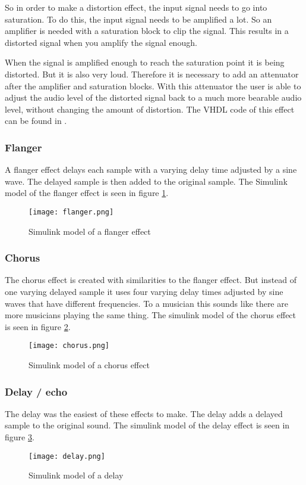 So in order to make a distortion effect, the input signal needs to go into saturation. To do this, the input signal needs to be amplified a lot. So an amplifier is needed with a saturation block to clip the signal. This results in a distorted signal when you amplify the signal enough.

When the signal is amplified enough to reach the saturation point it is being distorted. But it is also very loud. Therefore it is necessary to add an attenuator after the amplifier and saturation blocks. With this attenuator the user is able to adjust the audio level of the distorted signal back to a much more bearable audio level, without changing the amount of distortion. The VHDL code of this effect can be found in \nameref{}.

\subsubsection{Flanger}
A flanger effect delays each sample with a varying delay time adjusted by a sine wave. The delayed sample is then added to the original sample. The Simulink model of the flanger effect is seen in figure \ref{fig:flangersimulink}.

\begin{figure}[ht]
    \centering
    \texttt{[image: flanger.png]}
    \caption{Simulink model of a flanger effect}
    \label{fig:flangersimulink}
\end{figure}

\subsubsection{Chorus}
The chorus effect is created with similarities to the flanger effect. But instead of one varying delayed sample it uses four varying delay times adjusted by sine waves that have different frequencies. To a musician this sounds like there are more musicians playing the same thing. The simulink model of the chorus effect is seen in figure \ref{fig:chorussimulink}.

\begin{figure}[ht]
    \texttt{[image: chorus.png]}
    \caption{Simulink model of a chorus effect}
    \label{fig:chorussimulink}
\end{figure}

\subsubsection{Delay / echo}
The delay was the easiest of these effects to make. The delay adds a delayed sample to the original sound. The simulink model of the delay effect is seen in figure \ref{fig:delaysimulink}.

\begin{figure}[ht]
    \centering
    \texttt{[image: delay.png]}
    \caption{Simulink model of a delay}
    \label{fig:delaysimulink}
\end{figure}

